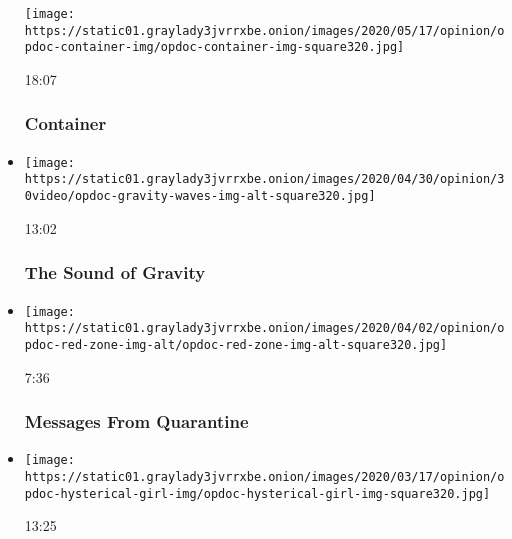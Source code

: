 \begin{itemize}
  \texttt{[image: https://static01.graylady3jvrrxbe.onion/images/2020/05/17/opinion/opdoc-container-img/opdoc-container-img-square320.jpg]}

  18:07

  \hypertarget{container}{%
  \subsubsection{Container}\label{container}}
\item
  \href{https://www.nytimes3xbfgragh.onion/video/opinion/100000006819172/the-sound-of-gravity.html?action=click\&module=video-series-bar\&region=header\&pgtype=Article\&playlistId=video/op-docs}{}

  \texttt{[image: https://static01.graylady3jvrrxbe.onion/images/2020/04/30/opinion/30video/opdoc-gravity-waves-img-alt-square320.jpg]}

  13:02

  \hypertarget{the-sound-of-gravity}{%
  \subsubsection{The Sound of Gravity}\label{the-sound-of-gravity}}
\item
  \href{https://www.nytimes3xbfgragh.onion/video/opinion/100000007062353/coronavirus-messages-from-quarantine.html?action=click\&module=video-series-bar\&region=header\&pgtype=Article\&playlistId=video/op-docs}{}

  \texttt{[image: https://static01.graylady3jvrrxbe.onion/images/2020/04/02/opinion/opdoc-red-zone-img-alt/opdoc-red-zone-img-alt-square320.jpg]}

  7:36

  \hypertarget{messages-from-quarantine}{%
  \subsubsection{Messages From
  Quarantine}\label{messages-from-quarantine}}
\item
  \href{https://www.nytimes3xbfgragh.onion/video/opinion/100000007026836/hysterical-girl.html?action=click\&module=video-series-bar\&region=header\&pgtype=Article\&playlistId=video/op-docs}{}

  \texttt{[image: https://static01.graylady3jvrrxbe.onion/images/2020/03/17/opinion/opdoc-hysterical-girl-img/opdoc-hysterical-girl-img-square320.jpg]}

  13:25

  \hypertarget{hysterical-girl}{%
}
\end{itemize}
